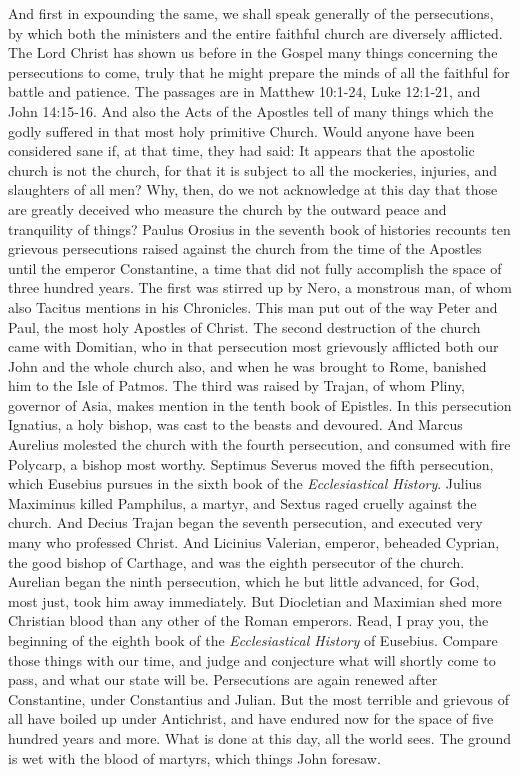 And first in expounding the same, we shall speak generally of the persecutions, by which both the ministers and the entire faithful church are diversely afflicted. The Lord Christ has shown us before in the Gospel many things concerning the persecutions to come, truly that he might prepare the minds of all the faithful for battle and patience. The passages are in Matthew 10:1-24, Luke 12:1-21, and John 14:15-16. And also the Acts of the Apostles tell of many things which the godly suffered in that most holy primitive Church. Would anyone have been considered sane if, at that time, they had said: It appears that the apostolic church is not the church, for that it is subject to all the mockeries, injuries, and slaughters of all men? Why, then, do we not acknowledge at this day that those are greatly deceived who measure the church by the outward peace and tranquility of things? Paulus Orosius in the seventh book of histories recounts ten grievous persecutions raised against the church from the time of the Apostles until the emperor Constantine, a time that did not fully accomplish the space of three hundred years. The first was stirred up by Nero, a monstrous man, of whom also Tacitus mentions in his Chronicles. This man put out of the way Peter and Paul, the most holy Apostles of Christ. The second destruction of the church came with Domitian, who in that persecution most grievously afflicted both our John and the whole church also, and when he was brought to Rome, banished him to the Isle of Patmos. The third was raised by Trajan, of whom Pliny, governor of Asia, makes mention in the tenth book of Epistles. In this persecution Ignatius, a holy bishop, was cast to the beasts and devoured. And Marcus Aurelius molested the church with the fourth persecution, and consumed with fire Polycarp, a bishop most worthy. Septimus Severus moved the fifth persecution, which Eusebius pursues in the sixth book of the \textit{Ecclesiastical History}. Julius Maximinus killed Pamphilus, a martyr, and Sextus raged cruelly against the church. And Decius Trajan began the seventh persecution, and executed very many who professed Christ. And Licinius Valerian, emperor, beheaded Cyprian, the good bishop of Carthage, and was the eighth persecutor of the church. Aurelian began the ninth persecution, which he but little advanced, for God, most just, took him away immediately. But Diocletian and Maximian shed more Christian blood than any other of the Roman emperors. Read, I pray you, the beginning of the eighth book of the \textit{Ecclesiastical History} of Eusebius. Compare those things with our time, and judge and conjecture what will shortly come to pass, and what our state will be. Persecutions are again renewed after Constantine, under Constantius and Julian. But the most terrible and grievous of all have boiled up under Antichrist, and have endured now for the space of five hundred years and more. What is done at this day, all the world sees. The ground is wet with the blood of martyrs, which things John foresaw.

